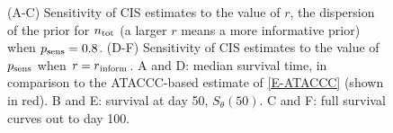 \documentclass[thesis.tex]{subfiles}
\begin{document}
\begin{figure}
  \vspace{-2.5cm}
  \caption{%
    (A-C) Sensitivity of CIS estimates to the value of $r$, the dispersion of the prior for $n_\text{tot}$ (a larger $r$ means a more informative prior) when $p_\text{sens} = 0.8$.
    (D-F) Sensitivity of CIS estimates to the value of $p_\text{sens}$ when $r = r{_{\text{inform}}}$.
    A and D: median survival time, in comparison to the ATACCC-based estimate of \cref{E-ATACCC} (shown in red).
    B and E: survival at day 50, $S_\theta(50)$.
    C and F: full survival curves out to day 100.
  }
  \label{imperf-test:fig:cis-sensitivity}
\end{figure}
\end{document}
